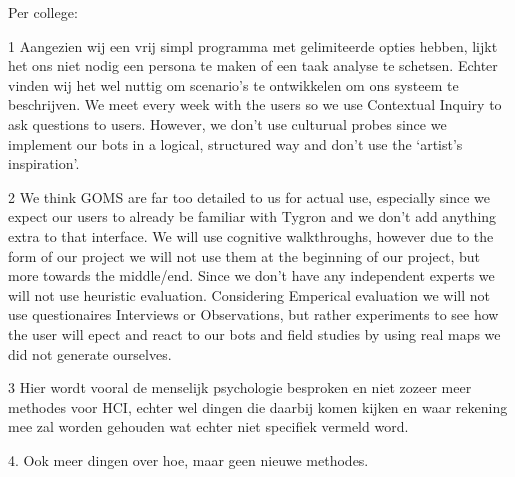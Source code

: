 Per college:

1
Aangezien wij een vrij simpl programma met gelimiteerde opties hebben, lijkt het ons niet nodig een persona te maken of een taak analyse te schetsen. 
Echter vinden wij het wel nuttig om scenario’s te ontwikkelen om ons systeem te beschrijven.
We meet every week with the users so we use Contextual Inquiry to ask questions to users. However, we don’t use culturual probes since we implement our bots in a logical, structured way and don’t use the ‘artist’s inspiration’.

2
We think GOMS are far too detailed to us for actual use, especially since we expect our users to already be familiar with Tygron and we don’t add anything extra to that interface. 
We will use cognitive walkthroughs, however due to the form of our project we will not use them at the beginning of our project, but more towards the middle/end. 
Since we don’t have any independent experts we will not use heuristic evaluation. 
Considering Emperical evaluation we will not use questionaires Interviews or Observations, but rather experiments to see how the user will epect and react to our bots and field studies by using real maps we did not generate ourselves.


3
Hier wordt vooral de menselijk psychologie besproken en niet zozeer meer methodes voor HCI, echter wel dingen die daarbij komen kijken en waar rekening mee zal worden gehouden wat echter niet specifiek vermeld word.

4.
Ook meer dingen over hoe, maar geen nieuwe methodes.